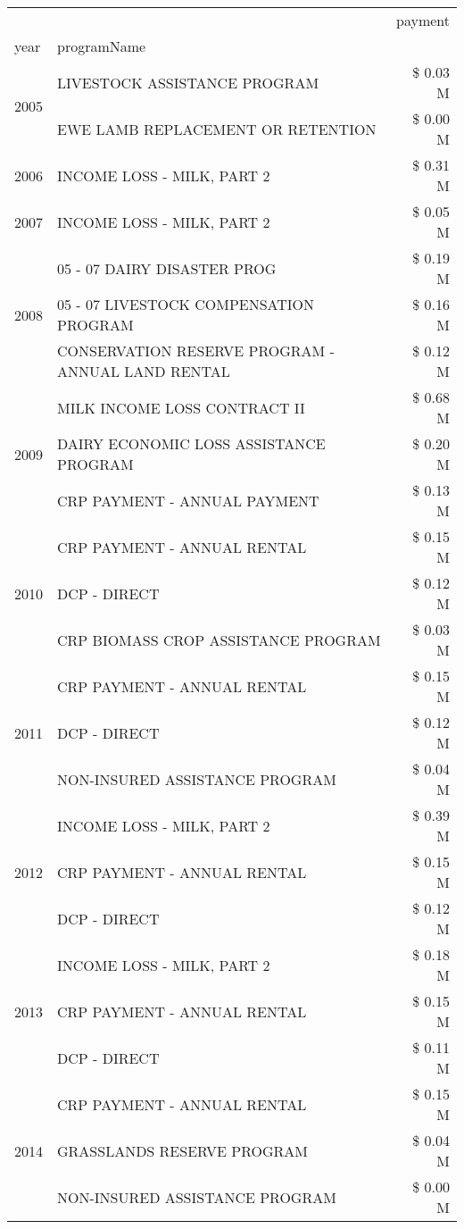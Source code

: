 \begin{tabular}{llr}
\toprule
 &  & payment \\
year & programName &  \\
\midrule
\multirow[t]{2}{*}{2005} & LIVESTOCK ASSISTANCE PROGRAM & \$ 0.03 M \\
 & EWE LAMB REPLACEMENT OR RETENTION & \$ 0.00 M \\
\cline{1-3}
2006 & INCOME LOSS - MILK, PART 2 & \$ 0.31 M \\
\cline{1-3}
2007 & INCOME LOSS - MILK, PART 2 & \$ 0.05 M \\
\cline{1-3}
\multirow[t]{3}{*}{2008} & 05 - 07 DAIRY DISASTER PROG & \$ 0.19 M \\
 & 05 - 07 LIVESTOCK COMPENSATION PROGRAM & \$ 0.16 M \\
 & CONSERVATION RESERVE PROGRAM - ANNUAL LAND RENTAL & \$ 0.12 M \\
\cline{1-3}
\multirow[t]{3}{*}{2009} & MILK INCOME LOSS CONTRACT II & \$ 0.68 M \\
 & DAIRY ECONOMIC LOSS ASSISTANCE PROGRAM & \$ 0.20 M \\
 & CRP PAYMENT - ANNUAL PAYMENT & \$ 0.13 M \\
\cline{1-3}
\multirow[t]{3}{*}{2010} & CRP PAYMENT - ANNUAL RENTAL & \$ 0.15 M \\
 & DCP - DIRECT & \$ 0.12 M \\
 & CRP BIOMASS CROP ASSISTANCE PROGRAM & \$ 0.03 M \\
\cline{1-3}
\multirow[t]{3}{*}{2011} & CRP PAYMENT - ANNUAL RENTAL & \$ 0.15 M \\
 & DCP - DIRECT & \$ 0.12 M \\
 & NON-INSURED ASSISTANCE PROGRAM & \$ 0.04 M \\
\cline{1-3}
\multirow[t]{3}{*}{2012} & INCOME LOSS - MILK, PART 2 & \$ 0.39 M \\
 & CRP PAYMENT - ANNUAL RENTAL & \$ 0.15 M \\
 & DCP - DIRECT & \$ 0.12 M \\
\cline{1-3}
\multirow[t]{3}{*}{2013} & INCOME LOSS - MILK, PART 2 & \$ 0.18 M \\
 & CRP PAYMENT - ANNUAL RENTAL & \$ 0.15 M \\
 & DCP - DIRECT & \$ 0.11 M \\
\cline{1-3}
\multirow[t]{3}{*}{2014} & CRP PAYMENT - ANNUAL RENTAL & \$ 0.15 M \\
 & GRASSLANDS RESERVE PROGRAM & \$ 0.04 M \\
 & NON-INSURED ASSISTANCE PROGRAM & \$ 0.00 M \\

\end{tabular}
